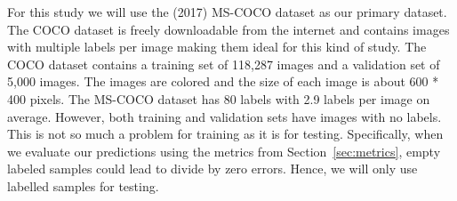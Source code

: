 \documentclass[12pt,journal,compsoc]{IEEEtran}
\begin{document}
For this study we will use the (2017) MS-COCO\cite{MSCOCO} dataset as our primary dataset. The COCO dataset is freely downloadable from the internet and contains images with multiple labels per image making them ideal for this kind of study. The COCO dataset contains a training set of 118,287 images and a validation set of 5,000 images.  The images are colored and the size of each image is about 600 * 400 pixels.  The MS-COCO dataset has 80 labels with 2.9 labels per image on average.  However, both training and validation sets have images with no labels.  This is not so much a problem for training as it is for testing.  Specifically, when we evaluate our predictions using the metrics from Section~\ref{sec:metrics}, empty labeled samples could lead to divide by zero errors.  Hence, we will only use labelled samples for testing. 









\end{document}
